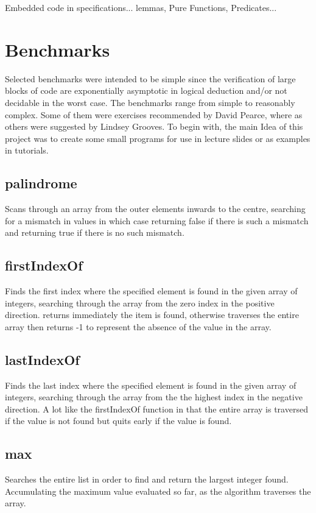 \documentclass[10pt]{article} %
\begin{document}
Embedded code in specifications... lemmas, Pure Functions, Predicates...

\section{Benchmarks}
Selected benchmarks were intended to be simple since the verification of large blocks of code are exponentially asymptotic in logical deduction and\slash or not decidable in the worst case. The benchmarks range from simple to reasonably complex. Some of them were exercises recommended by David Pearce, where as others were suggested by Lindsey Grooves. To begin with, the main Idea of this project was to create some small programs for use in lecture slides or as examples in tutorials. 

\subsection{palindrome} 
Scans through an array from the outer elements inwards to the centre, searching for a mismatch in values in which case returning false if there is such a mismatch and returning true if there is no such mismatch.

\subsection{firstIndexOf}
Finds the first index where the specified element is found in the given array of integers, searching through the array from the zero index in the positive direction. returns immediately the item is found, otherwise traverses the entire array then returns -1 to represent the absence of the value in the array.

\subsection{lastIndexOf}
Finds the last index where the specified element is found in the given array of integers, searching through the array from the the highest index in the negative direction. A lot like the firstIndexOf function in that the entire array is traversed if the value is not found but quits early if the value is found.

\subsection{max}
Searches the entire list in order to find and return the largest integer found. Accumulating the maximum value evaluated so far, as the algorithm traverses the array. 
\end{document}
